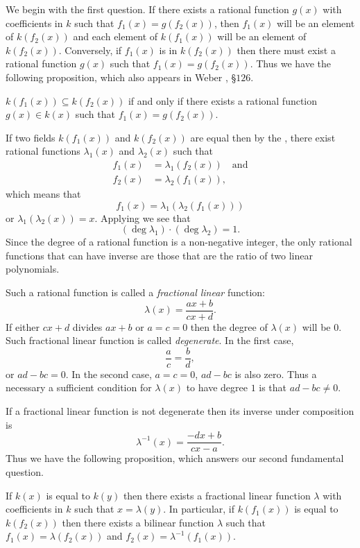 We begin with the first question.  If there exists a rational function
$g(x)$ with coefficients in $k$ such that $f_1(x) = g(f_2(x))$, then
$f_1(x)$ will be an element of $k(f_2(x))$ and each element of
$k(f_1(x))$ will be an element of $k(f_2(x))$.  Conversely, if
$f_1(x)$ is in $k(f_2(x))$ then there must exist a rational function
$g(x)$ such that $f_1(x) = g(f_2(x))$.  Thus we have the following
proposition, which also appears in Weber \cite{Weber:Algebra:II},
\S$126$.

\begin{proposition} \label{Luroth:Subfield:Prop}
$k(f_1(x)) \subseteq k(f_2(x))$ if and only if there exists a rational
function $g(x) \in k(x)$ such that $f_1(x) = g(f_2(x))$.
\end{proposition}

If two fields $k(f_1(x))$ and $k(f_2(x))$ are equal then by the
, there exist rational functions $\lambda_1(x)$ and
$\lambda_2(x)$ such that
\[
\begin{aligned}
f_1(x) & = \lambda_1(f_2(x))\quad \mbox{and}\\
f_2(x) & = \lambda_2(f_1(x)),
\end{aligned}
\]
which means that
\[
f_1(x) = \lambda_1(\lambda_2(f_1(x)))
\]
or $\lambda_1(\lambda_2(x)) = x$.  Applying
 we see that 
\[
(\deg \lambda_1) \cdot (\deg \lambda_2) = 1.
\]
Since the degree of a rational function is a non-negative integer, the
only rational functions that can have inverse are those that are the
ratio of two linear polynomials.  

Such a rational function is called a {\em fractional linear} function:
\[
\lambda(x) = \frac{a x + b}{c x + d}.
\]
If either $cx+d$ divides $ax+b$ or $a=c=0$ then the degree of
$\lambda(x)$ will be $0$.  Such fractional linear function is called
{\em degenerate\/}.  In the first case,
\[
\frac{a}{c} = \frac{b}{d},
\]
or $ad - bc = 0$.  In the second case, $a=c=0$, $ad -bc$ is also zero.
Thus a necessary a sufficient condition for $\lambda(x)$ to have
degree $1$ is that $ad-bc \not=0$.  

If a fractional linear function is not degenerate then its inverse
under composition is
\[
\lambda^{-1}(x) = \frac{-dx + b}{cx - a}.
\]
Thus we have the following proposition, which answers our second
fundamental question.

\begin{proposition}\label{Bilinear:Inverse:Prop}
If $k(x)$ is equal to $k(y)$ then there exists a fractional linear
function $\lambda$ with coefficients in $k$ such that $x =
\lambda(y)$.  In particular, if $k(f_1(x))$ is equal to $k(f_2(x))$
then there exists a bilinear function $\lambda$ such that $f_1(x) =
\lambda(f_2(x))$ and $f_2(x) = \lambda^{-1}(f_1(x))$.
\end{proposition}

